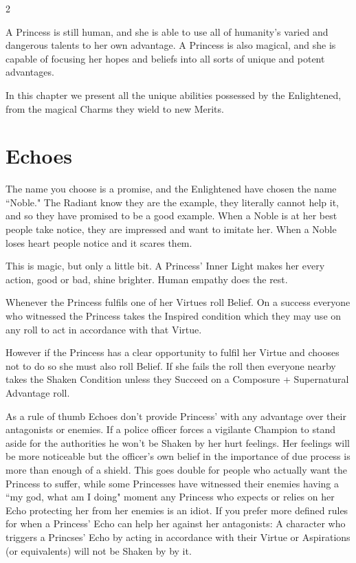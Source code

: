 \label{cha:PowerOfLove}

\begin{multicols}{2}\raggedcolumns

\noindent A Princess is still human, and she is able to use all of humanity's varied and dangerous talents to her own advantage. A Princess is also magical, and she is capable of focusing her hopes and beliefs into all sorts of unique and potent advantages. 

In this chapter we present all the unique abilities possessed by the Enlightened, from the magical Charms they wield to new Merits.


\section*{Echoes}
\label{sec:Echoes}

The name you choose is a promise, and the Enlightened have chosen the name \textquotedblleft Noble." The Radiant know they are the example, they literally cannot help it, and so they have promised to be a good example. When a Noble is at her best people take notice, they are impressed and want to imitate her. When a Noble loses heart people notice and it scares them.  

This is magic, but only a little bit. A Princess' Inner Light makes her every action, good or bad, shine brighter. Human empathy does the rest. 

Whenever the Princess fulfils one of her Virtues roll Belief. On a success everyone who witnessed the Princess takes the Inspired condition which they may use on any roll to act in accordance with that Virtue. 

However if the Princess has a clear opportunity to fulfil her Virtue and chooses not to do so she must also roll Belief. If she fails the roll then everyone nearby takes the Shaken Condition unless they Succeed on a Composure + Supernatural Advantage roll. 

As a rule of thumb Echoes don't provide Princess' with any advantage over their antagonists or enemies. If a police officer forces a vigilante Champion to stand aside for the authorities he won't be Shaken by her hurt feelings. Her feelings will be more noticeable but the officer's own belief in the importance of due process is more than enough of a shield. This goes double for people who actually want the Princess to suffer, while some Princesses have witnessed their enemies having a \textquotedblleft my god, what am I doing" moment any Princess who expects or relies on her Echo protecting her from her enemies is an idiot. If you prefer more defined rules for when a Princess' Echo can help her against her antagonists: A character who triggers a Princses' Echo by acting in accordance with their Virtue or Aspirations (or equivalents) will not be Shaken by by it. 


\end{multicols}
